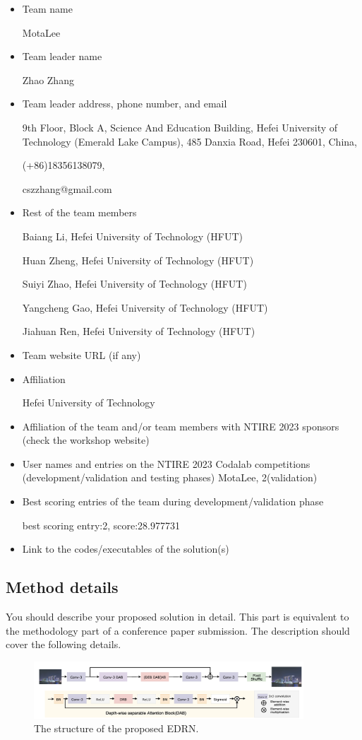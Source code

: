 \documentclass[10pt,twocolumn,letterpaper]{article}
\begin{document}
\begin{itemize}
\item Team name\par
MotaLee
\item Team leader name\par
Zhao Zhang                          
\item Team leader address, phone number, and email \par
9th Floor, Block A, Science And Education Building, Hefei University of Technology (Emerald Lake Campus), 485 Danxia Road, Hefei 230601, China,\par
(+86)18356138079,\par
cszzhang@gmail.com
\item Rest of the team members\par   
Baiang Li, Hefei University of Technology (HFUT)\par
Huan Zheng, Hefei University of Technology (HFUT)\par
Suiyi Zhao, Hefei University of Technology (HFUT)\par
Yangcheng Gao, Hefei University of Technology (HFUT)\par
Jiahuan Ren, Hefei University of Technology (HFUT)
\item Team website URL (if any)                   
\item Affiliation\par
Hefei University of Technology
\item Affiliation of the team and/or team members with NTIRE 2023 sponsors (check the workshop website)
\item User names and entries on the NTIRE 2023 Codalab competitions (development/validation and testing phases)
MotaLee, 2(validation)
\item Best scoring entries of the team during development/validation phase\par
best scoring entry:2, score:28.977731

\item Link to the codes/executables of the solution(s)
\end{itemize}

\subsection{Method details}

You should describe your proposed solution in detail. This part is equivalent to the methodology part of a conference paper submission. The description should cover the following details.
\begin{figure}[t]
	\centering
	\includegraphics[width=0.9\textwidth]{edrn.png}
	\caption{The structure of the proposed EDRN.}
	\label{Fig.main1}
\end{figure}
\end{document}

